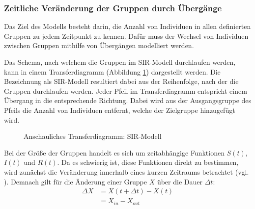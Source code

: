 \documentclass[../main.tex]{subfiles}
\begin{document}
        \subsubsection{Zeitliche Veränderung der Gruppen durch Übergänge}
        \label{sssec:transitions}

        Das Ziel des Modells besteht darin, die Anzahl von Individuen in allen definierten Gruppen zu jedem Zeitpunkt zu kennen. 
        Dafür muss der Wechsel von Individuen zwischen Gruppen mithilfe von Übergängen modelliert werden.
        
        Das Schema, nach welchem die Gruppen im SIR-Modell durchlaufen werden, kann in einem Transferdiagramm (Abbildung \ref{fig:sir_transfer_verbose}) dargestellt werden. Die Bezeichnung als SIR-Modell resultiert dabei aus der Reihenfolge, nach der die Gruppen durchlaufen werden.
        Jeder Pfeil im Transferdiagramm entspricht einem Übergang in die entsprechende Richtung. Dabei wird aus der Ausgangsgruppe des Pfeils die Anzahl von Individuen entfernt, welche der Zielgruppe hinzugefügt wird.

        \begin{figure}[h]
            \centering
            \caption{Anschauliches Transferdiagramm: SIR-Modell}
            \label{fig:sir_transfer_verbose}
        \end{figure}


        Bei der Größe der Gruppen handelt es sich um zeitabhängige Funktionen $S(t)$, $I(t)$ und $R(t)$. Da es schwierig ist, diese Funktionen direkt zu bestimmen, wird zunächst die Veränderung innerhalb eines kurzen Zeitraums betrachtet (vgl. \cite[S. 7]{Li18}).
        Demnach gilt für die Änderung einer Gruppe $X$ über die Dauer $\Delta t$:
        \begin{equation}
            \label{eq:difference}
            \begin{split}
                \Delta X &= X(t+\Delta t) - X(t) \\
                         &= X_{in} - X_{out}
            \end{split}
        \end{equation}
\end{document}
